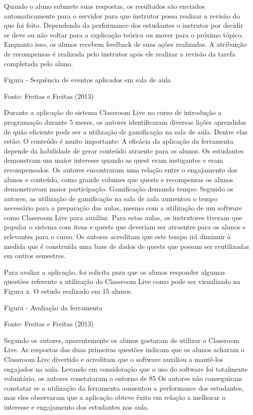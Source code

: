 \documentclass[
	12pt,				%
	oneside,			%
	a4paper,			%
	english,			%
	french,				%
	spanish,			%
	brazil,				%
	]{abntex2}
\begin{document}
Quando o aluno submete suas respostas, os resultados são enviados automaticamente para o servidor para que instrutor possa realizar a revisão do que foi feito. Dependendo da performance dos estudantes o instrutor por decidir se deve ou não voltar para a explicação teórica ou mover para o próximo tópico. Enquanto isso, os alunos recebem feedback de suas ações realizadas. A atribuição de recompensas é realizada pelo instrutor após ele realizar a revisão da tarefa completada pelo aluno.



Figura - Sequência de eventos aplicados em sala de aula

Fonte: Freitas e Freitas (2013)

Durante a aplicação do sistema Classroom Live no curso de introdução a programação durante 5 meses, os autores identificaram diversas lições aprendidas de quão eficiente pode ser a utilização de gamificação na sala de aula. Dentre elas estão:
O conteúdo é muito importante: A eficácia da aplicação da ferramenta depende da habilidade de gerar conteúdo atraente para os alunos. Os estudantes demonstram um maior interesse quando as quest eram instigantes e eram recompensados. Os autores encontraram uma relação entre o engajamento dos alunos e conteúdo, como grande volumes que quests e recompensas os alunos demonstravam maior participação.
Gamificação demanda tempo: Segundo os autores, as utilização de gamificação na sala de aula aumentou o tempo necessário para a preparação das aulas, mesmo com a utilização de um software como Classroom Live para auxiliar. Para estas aulas, os instrutores tiveram que popular o sistema com itens e quests que deveriam ser atraentes para os alunos e relevantes para o curso. Os autores acreditam que este tempo irá diminuir à medida que é construída uma base de dados de quests que possam ser reutilizadas em outros semestres.

Para avaliar a aplicação, foi solicita para que os alunos responder algumas questões referente a utilização do Classroom Live como pode ser visualizado na Figura x. O estudo realizado em 15 alunos.

Figura - Avaliação da ferramenta

Fonte: Freitas e Freitas (2013)

Segundo os autores, aparentemente os alunos gostaram de utilizar o Classroom Live. As respostas das duas primeiras questões indicam que os alunos acharam o Classroom Live divertido e acreditam que o software auxiliou a mantê-los engajados na aula. Levando em consideração que o uso do software foi totalmente voluntário, os autores constataram o entorno de 85%
Os autores não conseguiram constatar se a utilização da ferramenta aumentou a performance dos estudantes, mas eles observaram que a aplicação obteve êxito em relação a melhorar o interesse e engajamento dos estudantes nas aula.
\end{document}
